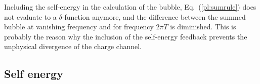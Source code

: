 Including the self-energy in the calculation of the bubble,   Eq.~(\ref{pl:sumrule}) does not evaluate to a $\delta$-function anymore, and the difference between the summed bubble at vanishing frequency and for frequency $2\pi T$ is diminished. 
This is probably the reason why the inclusion of the self-energy feedback prevents the unphysical divergence of the charge channel.     


\subsection{Self energy}


